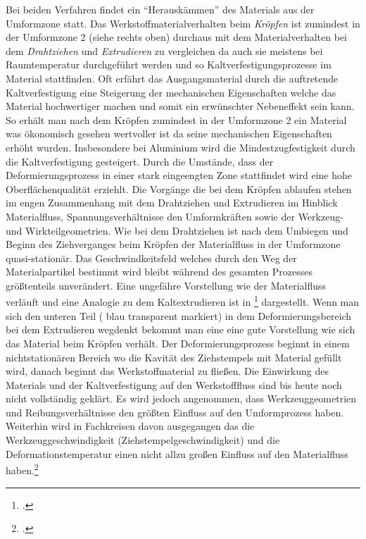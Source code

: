 \documentclass[12pt,a4paper,parskip]{scrartcl}
\begin{document}
Bei beiden Verfahren findet ein "`Herauskämmen"' des Materials aus der Umformzone statt. Das Werkstoffmaterialverhalten beim \emph{Kröpfen} ist zumindest in der Umformzone 2 (siehe  rechts oben) durchaus mit dem Materialverhalten bei dem \emph{Drahtziehen} und \emph{Extrudieren} zu vergleichen da auch sie meistens bei Raumtemperatur durchgeführt werden und so Kaltverfestigungsprozesse im Material stattfinden. Oft erfährt das Ausgangsmaterial durch die auftretende Kaltverfestigung        
eine Steigerung der mechanischen Eigenschaften welche das Material hochwertiger machen und somit ein erwünschter Nebeneffekt sein kann. So erhält man nach dem Kröpfen zumindest in der Umformzone 2 ein Material was ökonomisch gesehen wertvoller ist da seine mechanischen Eigenschaften erhöht wurden. Insbesondere bei Aluminium wird die Mindestzugfestigkeit durch die Kaltverfestigung gesteigert. Durch die Umstände, dass der Deformierungsprozess in einer stark eingeengten Zone stattfindet wird eine hohe Oberflächenqualität erziehlt. Die Vorgänge die bei dem Kröpfen ablaufen stehen im engen Zusammenhang mit dem Drahtziehen und Extrudieren im Hinblick  Materialfluss, Spannungsverhältnisse den Umformkräften sowie der Werkzeug- und Wirkteilgeometrien. Wie bei dem Drahtziehen ist nach dem Umbiegen und Beginn des Ziehverganges beim Kröpfen der Materialfluss in der Umformzone quasi-stationär. Das Geschwindkeitsfeld welches durch den Weg der Materialpartikel bestimmt wird bleibt während des gesamten Prozesses größtenteils unverändert. Eine ungefähre Vorstellung wie der Materialfluss verläuft und  eine Analogie zu dem Kaltextrudieren ist in \footcite[Vgl.][13.9]{kl} dargestellt. Wenn man sich den unteren Teil ( blau transparent markiert) in dem Deformierungsbereich bei dem Extrudieren wegdenkt bekommt man eine eine gute Vorstellung wie sich das Material beim Kröpfen verhält. Der Deformierungsprozess beginnt in einem nichtstationären Bereich wo die Kavität des Ziehstempels mit Material gefüllt wird, danach beginnt das  Werkstoffmaterial zu fließen. Die Einwirkung des Materials und der Kaltverfestigung auf den Werkstofffluss sind bis heute noch nicht vollständig geklärt. Es wird jedoch angenommen, dass  
Werkzeuggeometrien und Reibungsverhältnisse den größten Einfluss auf den Umformprozess haben. Weiterhin wird in Fachkreisen davon ausgegangen das die Werkzeuggeschwindigkeit (Ziehstempelgeschwindigkeit) und die Deformationstemperatur einen nicht allzu großen Einfluss auf den Materialfluss haben.\footcite[Vgl.][13.10]{kl} 
\end{document}
